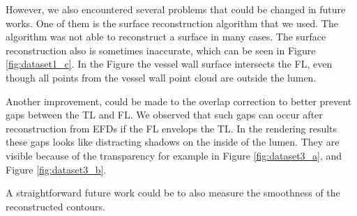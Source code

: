 \documentclass[thesis.tex]{subfiles}
\begin{document}
However, we also encountered several problems that could be changed in future works. One of them is the surface reconstruction algorithm that we used. The algorithm was not able to reconstruct a surface in many cases. The surface reconstruction also is sometimes inaccurate, which can be seen in Figure \ref{fig:dataset1_c}. In the Figure the vessel wall surface intersects the FL, even though all points from the vessel wall point cloud are outside the lumen.

Another improvement, could be made to the overlap correction to better prevent gaps between the TL and FL. We observed that such gaps can occur after reconstruction from EFDs if the FL envelops the TL. In the rendering results these gaps looks like distracting shadows on the inside of the lumen. They are visible because of the transparency for example in Figure \ref{fig:dataset3_a}, and Figure \ref{fig:dataset3_b}.

A straightforward future work could be to also measure the smoothness of the reconstructed contours.  

\subfilebib %
\end{document}
